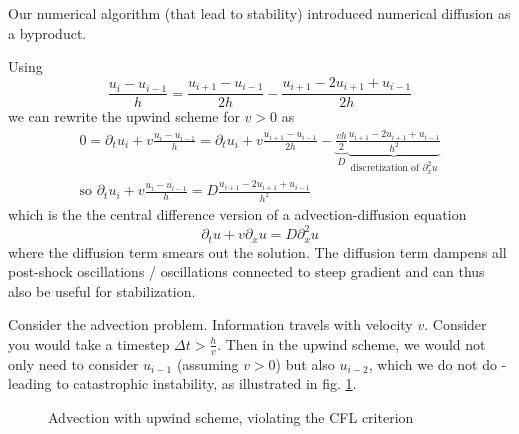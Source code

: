 
Our numerical algorithm (that lead to stability) introduced numerical diffusion as a byproduct.

Using
\begin{equation}
    \frac{u_i - u_{i-1}}{h} = \frac{u_{i + 1} - u_{i-1}}{2h} - \frac{u_{i + 1} - 2u_{i + 1} + u_{i-1}}{2h}
\end{equation}
we can rewrite the upwind scheme for $v > 0$ as
\begin{equation}
    \begin{gathered}
        0 = \partial_t u_i + v \frac{u_i - u_{i-1}}{h} = \partial_t u_i + v \frac{u_{i + 1} - u_{i-1}}{2h} - \underbrace{\frac{vh}{2}}_{D} \underbrace{\frac{u_{i + 1} - 2u_{i + 1} + u_{i-1}}{h^2}}_{\text{discretization of } \partial_x^2 u} \\
        \text{so } \partial_t u_i + v \frac{u_i - u_{i-1}}{h} = D \frac{u_{i + 1} - 2u_{i + 1} + u_{i-1}}{h^2}
    \end{gathered}
\end{equation}
which is the \textcolor{blue1}{the central difference version of a advection-diffusion equation}
\begin{equation}
    \partial_t u + v \partial_x u = D \partial_x^2 u
\end{equation}
where the diffusion term smears out the solution.
The diffusion term dampens all post-shock oscillations / oscillations connected to steep gradient
and can thus also be useful for stabilization.

Consider the advection problem. Information travels with velocity $v$. Consider you would
take a timestep $\Delta t > \frac{h}{v}$. Then in the upwind scheme, we would not only
need to consider $u_{i-1}$ (assuming $v > 0$) but also $u_{i-2}$, which we do not do - leading
to catastrophic instability, as illustrated in fig. \ref{fig:advection_cfl}.

\begin{figure}[htb!]
    \centering
    
    \caption{Advection with upwind scheme, violating the CFL criterion}
    \label{fig:advection_cfl}
\end{figure}

